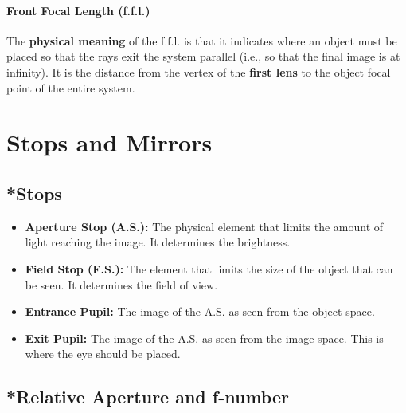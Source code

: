 \subsubsection*{Front Focal Length (f.f.l.)}
The \textbf{physical meaning} of the f.f.l. is that it indicates where an object must be placed so that the rays exit the system parallel (i.e., so that the final image is at infinity). It is the distance from the vertex of the \textbf{first lens} to the object focal point of the entire system.

\vspace{0.5cm}
\noindent{}

\chapter{Stops and Mirrors}

\section{*Stops}
\begin{itemize}
    \item \textbf{Aperture Stop (A.S.):} The physical element that limits the amount of light reaching the image. It determines the brightness.
    \item \textbf{Field Stop (F.S.):} The element that limits the size of the object that can be seen. It determines the field of view.
    \item \textbf{Entrance Pupil:} The image of the A.S. as seen from the object space.
    \item \textbf{Exit Pupil:} The image of the A.S. as seen from the image space. This is where the eye should be placed.
\end{itemize}

\section{*Relative Aperture and f-number}
\noindent{}

